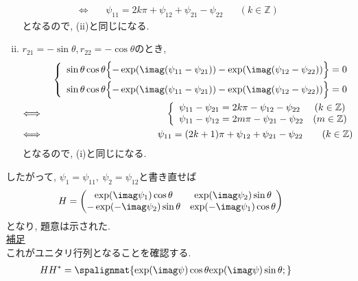 \documentclass[dvipdfmx,titlepage, 11pt, a4paper]{jsarticle}%
\begin{document}
\begin{enumerate}[(1)]
\begin{enumerate}[(i)]
\begin{eqnarray*}
        \Longleftrightarrow\ && \psi_{11}=2k\pi+\psi_{12}+\psi_{21}-\psi_{22}\hspace{20pt} (k\in\mathbb{Z})
      \end{eqnarray*}
      となるので, (ii)と同じになる.
    \item $r_{21}=-\sin\theta,r_{22}=-\cos\theta$のとき,
      \begin{eqnarray*}
        &&\left\{
        \begin{array}{l}
          \sin\theta\cos\theta\Bigl\{-\exp(\imag(\psi_{11}-\psi_{21}))-\exp(\imag(\psi_{12}-\psi_{22}))\Bigr\}=0\\[0.2cm]
          \sin\theta\cos\theta\Bigl\{-\exp(\imag(\psi_{11}-\psi_{21}))-\exp(\imag(\psi_{12}-\psi_{22}))\Bigr\}=0
        \end{array}
        \right.\\
        \Longleftrightarrow\ &&\left\{
                                \begin{array}{lc}
                                  \psi_{11}-\psi_{21}=2k\pi -\psi_{12}-\psi_{22}&(k\in\mathbb{Z})\\
                                  \psi_{11}-\psi_{12}=2m\pi-\psi_{21}-\psi_{22}&(m\in\mathbb{Z})\\
                                \end{array}
        \right.\\
        \Longleftrightarrow\ && \psi_{11}=(2k+1)\pi+\psi_{12}+\psi_{21}-\psi_{22}\hspace{20pt} (k\in\mathbb{Z})
      \end{eqnarray*}
      となるので, (i)と同じになる.\\
    \end{enumerate}
    したがって, $\psi_{1}=\psi_{11},\ \psi_{2}=\psi_{12}$と書き直せば
    \begin{eqnarray*}
      H=\begin{pmatrix}\exp(\imag\psi_{1})\cos\theta&\exp(\imag\psi_{2})\sin\theta\\-\exp(-\imag\psi_{2})\sin\theta&\exp(-\imag\psi_{1})\cos\theta\end{pmatrix}
    \end{eqnarray*}
    となり, 題意は示された.\\[0.2cm]
    \underline{補足}\\
    これがユニタリ行列となることを確認する.
    \begin{align*}
        HH^{\ast} & = 
        \spalignmat{
            {\exp(\imag \psi)\cos\theta} {\exp(\imag \psi)\sin\theta};
}
\end{align*}
\end{enumerate}
\end{document}
